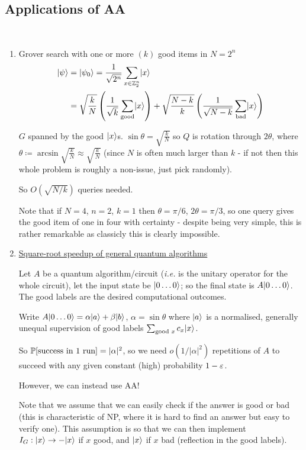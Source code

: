 \documentclass[]{article}
\begin{document}
\subsection*{Applications of AA}
\ 
\begin{enumerate}
	\item Grover search with one or more $(k)$ good items in $N = 2^n$
	\begin{align*}
		\ket{\psi} &= \ket{\psi_0} = \frac{1}{\sqrt{2^n}}\sum_{x\in \Z_2^n}\ket{x}\\
		&= \sqrt{\frac{k}{N}}\left(\frac{1}{\sqrt{k}}\sum_{\textrm{good}}\ket{x}\right) + \sqrt{\frac{N-k}{k}}\left(\frac{1}{\sqrt{N-k}}\sum_{\textrm{bad}}\ket{x}\right)
	\end{align*}

	$G$ spanned by the good $\ket{x}$s. $\sin\theta = \sqrt{\frac{k}{N}}$ so $Q$ is rotation through $2\theta$, where $\theta\coloneqq \arcsin\sqrt{\frac{k}{N}} \approx \sqrt{\frac{k}{N}}$ (since $N$ is often much larger than $k$ - if not then this whole problem is roughly a non-issue, just pick randomly).

	So $O(\sqrt{N/k})$ queries needed.

	Note that if $N = 4$, $n = 2$, $k = 1$ then $\theta = \pi/6$, $2\theta = \pi/3$, so one query gives the good item of one in four with certainty - despite being very simple, this is rather remarkable as classicly this is clearly impossible.


	\item \underline{Square-root speedup of general quantum algorithms}
	
	Let $A$ be a quantum algorithm/circuit (\textit{i.e.} is the unitary operator for the whole circuit), let the input state be $\ket{0\dots0}$; so the final state is $A\ket{0\dots0}$. The good labels are the desired computational outcomes.

	Write $A\ket{0\dots 0} = \alpha\ket{a} + \beta\ket{b}$, $\alpha = \sin\theta$ where $\ket{a}$ is a normalised, generally unequal supervision of good labels $\sum_{\textrm{good }x}c_x\ket{x}$.

	So $\P[\textrm{success in 1 run}] = |\alpha|^2$, so we need $o(1/|\alpha|^2)$ repetitions of $A$ to succeed with any given constant (high) probability $1 - \eps$.

	However, we can instead use AA!

	Note that we assume that we can easily check if the answer is good or bad (this is characteristic of NP, where it is hard to find an answer but easy to verify one). This assumption is so that we can then implement $I_G:\ket{x}\ra -\ket{x}$ if $x$ good, and $\ket{x}$ if $x$ bad (reflection in the good labels).


\end{enumerate}
\end{document}
